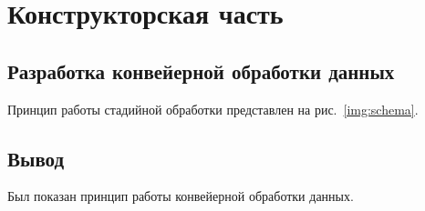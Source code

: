 \chapter{Конструкторская часть}

\section{Разработка конвейерной обработки данных}

Принцип работы стадийной обработки представлен на рис.~\ref{img:schema}.


\section*{Вывод}

Был показан принцип работы конвейерной обработки данных.
